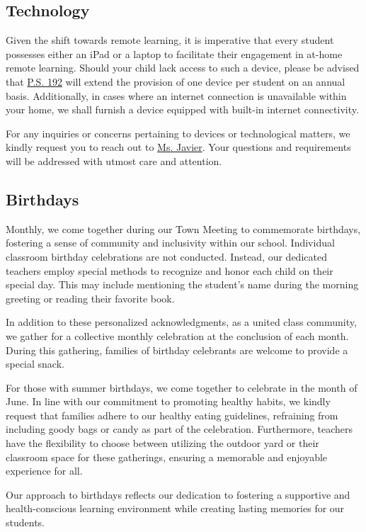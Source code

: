 \documentclass[11pt, letterpaper]{article}
\begin{document}
\subsection{Technology}
Given the shift towards remote learning, it is imperative that every student possesses either an iPad or a laptop to facilitate their engagement in at-home remote learning. Should your child lack access to such a device, please be advised that \href{https://www.ps192.org}{P.S. 192} will extend the provision of one device per student on an annual basis. Additionally, in cases where an internet connection is unavailable within your home, we shall furnish a device equipped with built-in internet connectivity.

For any inquiries or concerns pertaining to devices or technological matters, we kindly request you to reach out to \href{mailto:ajavier@schools.nyc.gov}{Ms. Javier}. Your questions and requirements will be addressed with utmost care and attention.

\subsection{Birthdays}
Monthly, we come together during our Town Meeting to commemorate birthdays, fostering a sense of community and inclusivity within our school. Individual classroom birthday celebrations are not conducted. Instead, our dedicated teachers employ special methods to recognize and honor each child on their special day. This may include mentioning the student's name during the morning greeting or reading their favorite book.

In addition to these personalized acknowledgments, as a united class community, we gather for a collective monthly celebration at the conclusion of each month. During this gathering, families of birthday celebrants are welcome to provide a special snack.

For those with summer birthdays, we come together to celebrate in the month of June. In line with our commitment to promoting healthy habits, we kindly request that families adhere to our healthy eating guidelines, refraining from including goody bags or candy as part of the celebration. Furthermore, teachers have the flexibility to choose between utilizing the outdoor yard or their classroom space for these gatherings, ensuring a memorable and enjoyable experience for all.

Our approach to birthdays reflects our dedication to fostering a supportive and health-conscious learning environment while creating lasting memories for our students.
\end{document}
